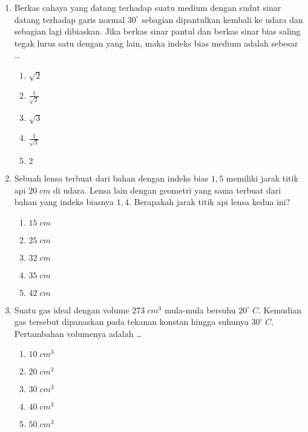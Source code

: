 \documentclass[A4,12PT, english, twocolumn]{journal}
\begin{document}
\begin{enumerate}
\item Berkas cahaya yang datang terhadap suatu medium dengan sudut sinar datang terhadap garis normal $30^\circ$ sebagian dipantulkan kembali ke udara dan sebagian lagi dibiaskan. Jika berkas sinar pantul dan berkas sinar bias saling tegak lurus satu dengan yang lain, maka indeks bias medium adalah sebesar \dots
    \begin{enumerate}
        \item $\sqrt{2}$
        \item $\frac{1}{\sqrt{2}}$
        \item $\sqrt{3}$
        \item $\frac{1}{\sqrt{3}}$
        \item $2$
    \end{enumerate}
  
\item Sebuah lensa terbuat dari bahan dengan indeks bias $1,5$ memiliki jarak titik api $20 \; cm$ di udara. Lensa lain dengan geometri yang sama terbuat dari bahan yang indeks biasnya $1,4$. Berapakah jarak titik api lensa kedua ini?
    \begin{enumerate}
        \item $15 \; cm$
        \item $25 \; cm$
        \item $32 \; cm$
        \item $35 \; cm$
        \item $42 \; cm$
    \end{enumerate}
    
\item Suatu gas ideal dengan volume $273 \; cm^3$ mula-mula bersuhu $20^\circ \; C$. Kemudian gas tersebut dipanaskan pada tekanan konstan hingga suhunya $30^\circ \; C$. Pertambahan volumenya adalah \dots
    \begin{enumerate}
        \item $10 \; cm^3$
        \item $20 \; cm^3$
        \item $30 \; cm^3$
        \item $40 \; cm^3$
        \item $50 \; cm^3$
    \end{enumerate}


\end{enumerate}
\end{document}
